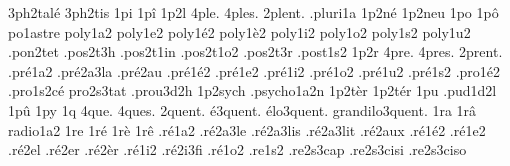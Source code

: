 {                    3ph2talé
                    3ph2tis
1pi
1pî
1p2l
4ple.
4ples.
2plent. %
                    .pluri1a
                    1p2né
                    1p2neu
1po
1pô
                    po1astre
                    poly1a2
                    poly1e2
                    poly1é2
                    poly1è2
                    poly1i2
                    poly1o2
                    poly1s2
                    poly1u2
                    .pon2tet %
                    .pos2t3h
                    .pos2t1in
                    .pos2t1o2
                    .pos2t3r
                    .post1s2
1p2r
4pre.
4pres.
2prent. %
                    .pré1a2
                    .pré2a3la %
                    .pré2au
                    .pré1é2
                    .pré1e2
                    .pré1i2
                    .pré1o2
                    .pré1u2
                    .pré1s2
                    .pro1é2
                    .pro1s2cé
                    pro2s3tat
                    .prou3d2h
                    1p2sych
                    .psycho1a2n
                    1p2tèr
                    1p2tér
1pu
                    .pud1d2l
1pû
1py
1q
4que.
4ques.
        2quent.
     é3quent.
   élo3quent.
grandilo3quent.
1ra
1râ
                    radio1a2 %
1re
1ré
1rè
1rê
                    .ré1a2
                    .ré2a3le
                    .ré2a3lis
                    .ré2a3lit
                    .ré2aux
                    .ré1é2
                    .ré1e2
                    .ré2el
                    .ré2er
                    .ré2èr
                    .ré1i2
                    .ré2i3fi
                    .ré1o2
                    .re1s2
                    .re2s3cap
                    .re2s3cisi %
                    .re2s3ciso %
}
